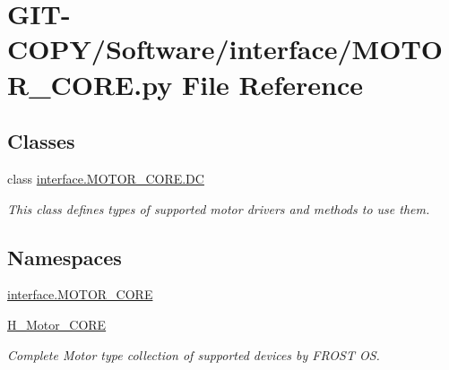 \hypertarget{GIT-COPY_2Software_2interface_2MOTOR__CORE_8py}{}\section{G\+I\+T-\/\+C\+O\+P\+Y/\+Software/interface/\+M\+O\+T\+O\+R\+\_\+\+C\+O\+R\+E.py File Reference}
\label{GIT-COPY_2Software_2interface_2MOTOR__CORE_8py}
\subsection*{Classes}
\begin{DoxyCompactItemize}
\item 
class \hyperlink{classinterface_1_1MOTOR__CORE_1_1DC}{interface.\+M\+O\+T\+O\+R\+\_\+\+C\+O\+R\+E.\+D\+C}
\begin{DoxyCompactList}\small\item\em This class defines types of supported motor drivers and methods to use them. \end{DoxyCompactList}\end{DoxyCompactItemize}
\subsection*{Namespaces}
\begin{DoxyCompactItemize}
\item 
 \hyperlink{namespaceinterface_1_1MOTOR__CORE}{interface.\+M\+O\+T\+O\+R\+\_\+\+C\+O\+R\+E}
\item 
 \hyperlink{namespaceH__Motor__CORE}{H\+\_\+\+Motor\+\_\+\+C\+O\+R\+E}
\begin{DoxyCompactList}\small\item\em Complete Motor type collection of supported devices by F\+R\+O\+S\+T O\+S. \end{DoxyCompactList}\end{DoxyCompactItemize}
